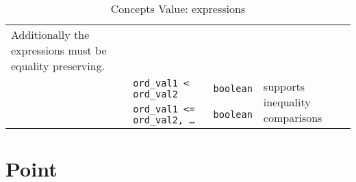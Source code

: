 \begin{table}[!htbp]
\begin{scriptsize}
\begin{tabular}{llll}
{      Additionally the expressions must be equality preserving.}                                                                                                                                          \\
      \multicolumn{1}{c|}{}                                 & \texttt{ord\_val1 < ord\_val2}         & \texttt{boolean}         & \multicolumn{1}{l}{\multirow{2}{*}{supports inequality comparisons}}    \\
      \multicolumn{1}{c|}{}                                 & \texttt{ord\_val1 <= ord\_val2, \dots} & \texttt{boolean}         & \multicolumn{1}{l}{}                                                    \\
      \cline{1-4}
    \end{tabular}
    \smallskip

    \caption{Concepts Value: expressions}
  \end{scriptsize}
  \label{concept.tables.value.expressions}
\end{table}


\section{Point}

